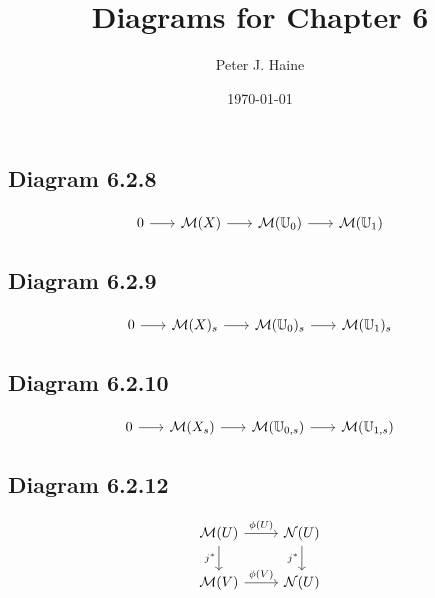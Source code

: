 \documentclass[leqno]{amsart}
\title{Diagrams for Chapter 6}
\author{Peter J. Haine}
\date{\today}
\begin{document}
	\maketitle

	\subsection*{Diagram 6.2.8}

	\begin{equation*}
		\begin{tikzcd}[sep=scriptsize]
			0 \arrow{r} & \mathcal{M}(X) \arrow{r} & \mathcal{M}(\mathbb{U}_0) \arrow{r} & \mathcal{M}(\mathbb{U}_1)
		\end{tikzcd}
	\end{equation*}

	\subsection*{Diagram 6.2.9}

	\begin{equation*}
		\begin{tikzcd}[sep=scriptsize]
			0 \arrow{r} & \mathcal{M}(X)_s \arrow{r} & \mathcal{M}(\mathbb{U}_0)_s \arrow{r} & \mathcal{M}(\mathbb{U}_1)_s
		\end{tikzcd}
	\end{equation*}

	\subsection*{Diagram 6.2.10}

	\begin{equation*}
		\begin{tikzcd}[sep=scriptsize]
			0 \arrow{r} & \mathcal{M}(X_s) \arrow{r} & \mathcal{M}(\mathbb{U}_{0,s}) \arrow{r} & \mathcal{M}(\mathbb{U}_{1,s})
		\end{tikzcd}
	\end{equation*}
	
	\subsection*{Diagram 6.2.12}

	\begin{equation*}
		\begin{tikzcd}
			\mathcal{M}(U) \arrow{r}{\phi(U)} \arrow{d}[swap]{j^{\ast}} & \mathcal{N}(U) \arrow{d}[swap]{j^{\ast}} \\
			\mathcal{M}(V) \arrow{r}{\phi(V)}  & \mathcal{N}(U)
		\end{tikzcd}
	\end{equation*}
\end{document}
